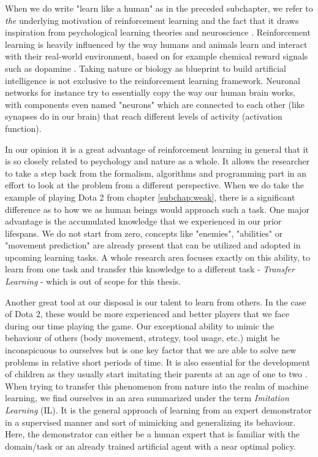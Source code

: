 When we do write "learn like a human" as in the preceded subchapter, we refer to \textit{the} underlying motivation of reinforcement learning and the fact that it draws inspiration from psychological learning theories \cite[p.~341]{Sutton1998} and neuroscience \cite[p.~377]{Sutton1998}. Reinforcement learning is heavily influenced by the way humans and animals learn and interact with their real-world environment, based on for example chemical reward signals such as dopamine \cite[p.~383]{Sutton1998}. Taking nature or biology as blueprint to build artificial intelligence is not exclusive to the reinforcement learning framework. Neuronal networks for instance try to essentially copy the way our human brain works, with components even named "neurons" which are connected to each other (like synapses do in our brain) that reach different levels of activity (activation function).
\par
In our opinion it is a great advantage of reinforcement learning in general that it is so closely related to psychology and nature as a whole. It allows the researcher to take a step back from the formalism, algorithms and programming part in an effort to look at the problem from a different perspective. When we do take the example of playing Dota 2 from chapter \ref{subchap:weak}, there is a significant difference as to how we as human beings would approach such a task. One major advantage is the accumulated knowledge that we experienced in our prior lifespans. We do not start from zero, concepts like "enemies", "abilities" or "movement prediction" are already present that can be utilized and adopted in upcoming learning tasks. A whole research area focuses exactly on this ability, to learn from one task and transfer this knowledge to a different task - \textit{Transfer Learning} - which is out of scope for this thesis.
\par
Another great tool at our disposal is our talent to learn from others. In the case of Dota 2, these would be more experienced and better players that we face during our time playing the game. Our exceptional ability to mimic the behaviour of others (body movement, strategy, tool usage, etc.) might be inconspicuous to ourselves but is one key factor that we are able to solve new problems in relative short periods of time. It is also essential for the development of children as they usually start imitating their parents at an age of one to two \cite[p.347]{wood2013whom}. When trying to transfer this phenomenon from nature into the realm of machine learning, we find ourselves in an area summarized under the term \textit{Imitation Learning} (IL). It is the general approach of learning from an expert demonstrator in a supervised manner and sort of mimicking and generalizing its behaviour. Here, the demonstrator can either be a human expert that is familiar with the domain/task or an already trained artificial agent with a near optimal policy.
